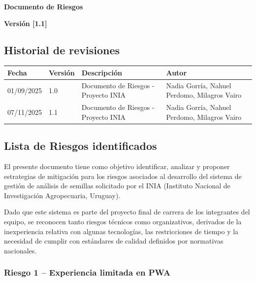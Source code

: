 
{\Large\bfseries Documento de Riesgos}

\vspace{1em}
\textbf{Versión [1.1]}

\vspace{2em}
\begingroup\let\clearpage\relax
\subsection{Historial de revisiones}
\endgroup

\begin{table}[H]
\centering
\begin{tabular}{|p{3cm}|p{2cm}|p{6cm}|p{3cm}|}
\hline
\textbf{Fecha} & \textbf{Versión} & \textbf{Descripción} & \textbf{Autor} \\
\hline
01/09/2025 & 1.0 & Documento de Riesgos - Proyecto INIA & Nadia Gorría, Nahuel Perdomo, Milagros Vairo \\
\hline
07/11/2025 & 1.1 & Documento de Riesgos - Proyecto INIA & Nadia Gorría, Nahuel Perdomo, Milagros Vairo \\
\hline
\end{tabular}
\end{table}

\clearpage

\subsection{Lista de Riesgos identificados}

El presente documento tiene como objetivo identificar, analizar y proponer estrategias de mitigación para los riesgos asociados al desarrollo del sistema de gestión de análisis de semillas solicitado por el INIA (Instituto Nacional de Investigación Agropecuaria, Uruguay).

Dado que este sistema es parte del proyecto final de carrera de los integrantes del equipo, se reconocen tanto riesgos técnicos como organizativos, derivados de la inexperiencia relativa con algunas tecnologías, las restricciones de tiempo y la necesidad de cumplir con estándares de calidad definidos por normativas nacionales.

\subsubsection{Riesgo 1 -- Experiencia limitada en PWA}

